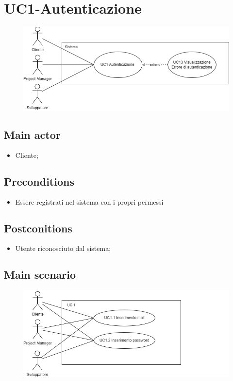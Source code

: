 \documentclass{article}
\begin{document}
\section{UC1-Autenticazione}
    \begin{figure}[h]
      \centering
      \includegraphics{./imgUML/UC1.png}
      \label{fig:immagine}
    \end{figure} 
    
     \subsection*{Main actor}
         \begin{itemize}
             \item Cliente;
         \end{itemize}
     \subsection*{Preconditions} 
        \begin{itemize}
            \item Essere registrati nel sistema con i propri permessi
        \end{itemize}
               
    \subsection*{Postconitions}
        \begin{itemize}
            \item Utente riconosciuto dal sistema;
        \end{itemize}
    \subsection*{Main scenario}
        \begin{figure}[h]
            \centering
            \includegraphics{./imgUML/UC1-zoom.png}
            \label{fig:immagine}
        \end{figure}
            
\end{document}
